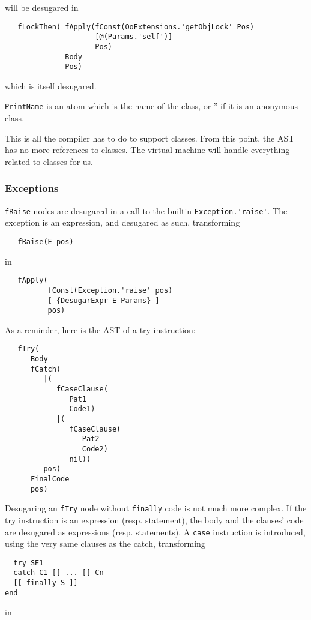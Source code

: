 \documentclass[a4paper]{memoir}
\begin{document}
will be desugared in 

\begin{lstlisting}
   fLockThen( fApply(fConst(OoExtensions.'getObjLock' Pos) 
                     [@(Params.'self')] 
                     Pos)
              Body 
              Pos)  
\end{lstlisting}
which is itself desugared.

\lstinline!PrintName! is an atom which is the name of the class, or '' if it is
an anonymous class.

This is all the compiler has to do to support classes. From this point, the AST
has no more references to classes. The virtual machine will handle everything related to classes for us.

\subsubsection{Exceptions}\label{sec:arch:desugar:exceptions}
\lstinline!fRaise! nodes are desugared in a call to the builtin
\lstinline!Exception.'raise'!. The exception is an expression, and desugared as
such, transforming
\begin{lstlisting}
   fRaise(E pos)
\end{lstlisting}
in
\begin{lstlisting}
   fApply(
          fConst(Exception.'raise' pos) 
          [ {DesugarExpr E Params} ] 
          pos)
\end{lstlisting}

As a reminder, here is the AST of a try instruction:
\begin{lstlisting}
   fTry(
      Body
      fCatch(
         |(
            fCaseClause(
               Pat1
               Code1)
            |(
               fCaseClause(
                  Pat2
                  Code2)
               nil))
         pos)
      FinalCode
      pos)
\end{lstlisting}
Desugaring an \lstinline!fTry! node without \lstinline!finally! code is not much
more complex.  If the try instruction is an expression (resp. statement), the
body and the clauses' code are desugared as expressions (resp. statements).
A \lstinline!case! instruction is introduced, using the very same clauses as the
catch, transforming \cite{BaseLang}
\begin{lstlisting}
  try SE1 
  catch C1 [] ... [] Cn 
  [[ finally S ]]
end
\end{lstlisting}

in
\end{document}
